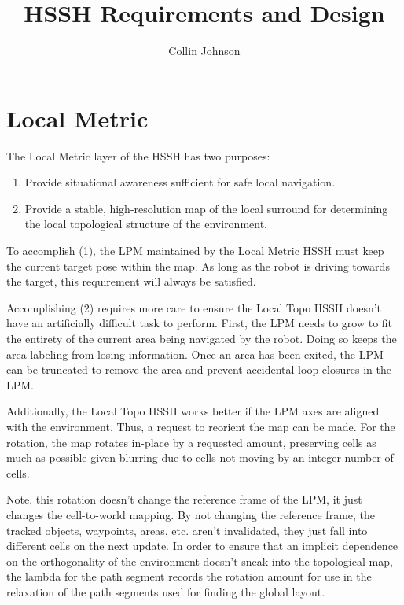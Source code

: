 \documentclass{article}
\title{HSSH Requirements and Design}
\author{Collin Johnson}
\begin{document}
\maketitle

\section{Local Metric}

The Local Metric layer of the HSSH has two purposes:

\begin{enumerate}
 \item Provide situational awareness sufficient for safe local navigation.
 \item Provide a stable, high-resolution map of the local surround for determining the local topological structure of 
  the environment.
\end{enumerate}

To accomplish (1), the LPM maintained by the Local Metric HSSH must keep the current target pose within the map. As 
long as the robot is driving towards the target, this requirement will always be satisfied.

Accomplishing (2) requires more care to ensure the Local Topo HSSH doesn't have an artificially difficult task to 
perform. First, the LPM needs to grow to fit the entirety of the current area being navigated by the robot. Doing so 
keeps the area labeling from losing information. Once an area has been exited, the LPM can be truncated to remove the 
area and prevent accidental loop closures in the LPM.

Additionally, the Local Topo HSSH works better if the LPM axes are aligned with the environment. Thus, a request to 
reorient the map can be made. For the rotation, the map rotates in-place by a requested amount, preserving cells as 
much as possible given blurring due to cells not moving by an integer number of cells.

Note, this rotation doesn't change the reference frame of the LPM, it just changes the cell-to-world mapping. By not 
changing the reference frame, the tracked objects, waypoints, areas, etc. aren't invalidated, they just fall into 
different cells on the next update. In order to ensure that an implicit dependence on the orthogonality of the 
environment doesn't sneak into the topological map, the lambda for the path segment records the rotation amount for use 
in the relaxation of the path segments used for finding the global layout.
\end{document}
